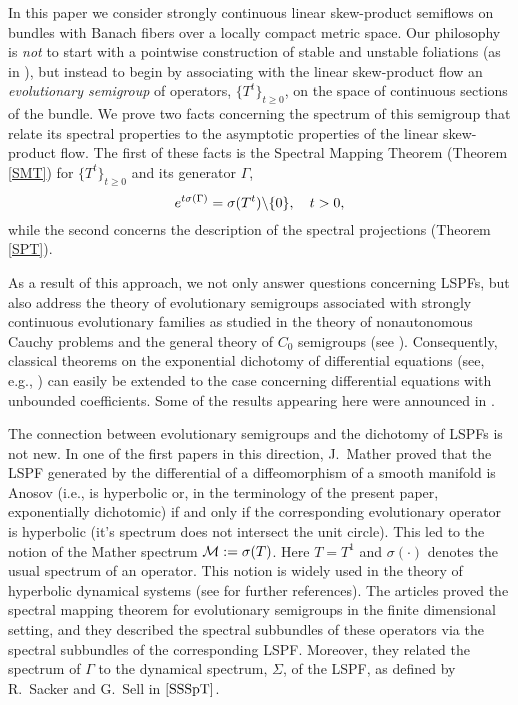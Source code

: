 In this paper we consider strongly continuous linear skew-product
semiflows on bundles with Banach fibers over a locally compact
metric space.  Our philosophy is {\em not} to start with a
pointwise construction of stable and unstable foliations (as in
\cite{Sel,ChLe1,ChLe2,Mag,SSDich,SSBan}), but
instead to begin by associating with the linear skew-product
flow an {\it evolutionary semigroup}
of operators, $\{T^t\}_{t\ge0}$, on the space of continuous
sections of the bundle. We prove two  facts
concerning the spectrum of this semigroup
that relate its spectral properties to the asymptotic properties of
the linear skew-product flow.  The first of these
facts is the Spectral Mapping Theorem (Theorem \ref{SMT}) for
$\{T^t\}_{t\ge0}$ and its generator $\Gamma$,
\[ e^{t\sigma(\Gamma)}=\sigma(T^t)\backslash \{0\},\quad t>0,\]
while the second concerns the description of the
spectral projections (Theorem \ref{SPT}).

As a result of this approach, we not only answer questions
concerning LSPFs, but also address the
theory of evolutionary semigroups associated with strongly
continuous evolutionary families as studied in the theory
of nonautonomous Cauchy problems and the general theory of
$C_0$ semigroups (see \cite{Evans,Gold,Howland,Lum,Nag,Nei,Rab}).
Consequently,  classical theorems on the
exponential dichotomy  of differential equations
(see, e.g., \cite{DK,MS}) can easily be extended to the case
concerning differential equations with unbounded coefficients.
Some of the results appearing here were announced in
\cite{LMS2}.

The connection between evolutionary semigroups and the dichotomy
of LSPFs is not new. In one of the first papers in this
direction, J.~Mather \cite{Mather} proved that the LSPF
generated by the differential of a diffeomorphism of
a smooth manifold is Anosov
(i.e., is hyperbolic or, in the terminology of the
present paper, exponentially dichotomic) if and only if
the corresponding evolutionary operator is hyperbolic (it's
spectrum does not intersect the unit circle).
This led to the notion of the Mather
spectrum ${\cal{M}}:=\sigma(T)$.  Here $T=T^1$ and  $\sigma(\cdot)$
denotes the usual spectrum of an operator.
This notion is widely used in the
theory of hyperbolic dynamical systems (see \cite{Pesin} for
further references). The articles \cite{CS,J} proved the spectral
mapping theorem for evolutionary semigroups in the finite
dimensional setting, and they described the spectral subbundles of
these operators via the spectral subbundles of the corresponding LSPF.
Moreover, they related the spectrum of $\Gamma$ to
the dynamical spectrum, $\Sigma$, of the LSPF, as defined by
R.~Sacker and G.~Sell in $\cite{SSSpT}$.

